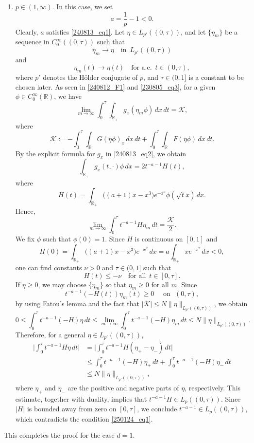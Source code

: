 \documentclass[reqno]{amsart}
\numberwithin{equation}{section}
\theoremstyle{plain}
\theoremstyle{definition}
\def\bR{\mathbb{R}}
\def\cK{\mathcal{K}}
\begin{document}
\begin{enumerate}[1.]
\item
$p\in (1, \infty)$.
In this case, we set 
\begin{equation}		\label{250124_eq1}
a=\frac{1}{p}-1<0.
\end{equation}
Clearly, $a$ satisfies \eqref{240813_eq1}.
Let  $\eta \in L_{p'}((0, \tau))$, and let $\{\eta_m\}$ be a sequence in $C^\infty_0((0,\tau))$ such that 
$$
\eta_m\to \eta \quad \text{in }\, L_{p'}((0,\tau))
$$
and 
$$
\eta_m(t)\to \eta(t) \quad \text{for a.e. }\, t\in (0,\tau),
$$
where $p'$ denotes the H\"older conjugate of $p$, and $\tau\in (0,1]$ is a constant to be chosen later.
As seen in \eqref{240812_F1} and \eqref{230805_eq3}, for a given $\phi\in C^\infty_0(\bR)$, we have 
$$
\lim_{m\to \infty} \int_0^\tau \int_{\bR_+} g_x(\eta_m \phi)\,dx\,dt=\cK,
$$
where 
$$
\cK:=-\int_0^\tau \int_{\bR} G (\eta \phi)_x\,dx\,dt+\int_0^\tau \int_{\bR} F (\eta \phi)\,dx\,dt.
$$
By the explicit formula for $g_x$ in \eqref{240813_eq2}, we obtain
$$
\int_{\bR_+} g_x(t, \cdot)\phi\,dx
=2t^{-a-1}H(t),
$$
where 
$$
H(t)=\int_{\bR_+} \big((a+1)x-x^3\big)e^{-x^2} \phi(\sqrt{t}x)\,dx.
$$
Hence, 
$$
\lim_{m\to \infty} \int_0^\tau t^{-a-1} H \eta_m \,dt=\frac{\cK}{2}.
$$
We fix $\phi$ such that $\phi(0) = 1$.
Since $H$ is continuous on $[0,1]$ and 
$$
H(0)=\int_{\bR_+} \big((a+1)x-x^3\big)e^{-x^2}\,dx = a\int_{\bR_+} x e^{-x^2}\,dx<0,
$$
one can find constants $\nu>0$ and $\tau\in (0,1]$ such that 
$$
H(t)\le -\nu \quad \text{for all }\, t\in [0, \tau].
$$
If $\eta\ge 0$, we may choose $\{\eta_m\}$ so that $\eta_m\ge0$ for all $m$.
Since
\[
t^{-a-1}(-H(t))\eta_m(t)\ge 0 \quad \textrm{ on } \,\, (0, \tau),
\]
by using Fatou's lemma and the fact that $|\cK|\le N \|\eta\|_{L_{p'}((0, \tau))}$,  we obtain 
$$
0\le \int_0^\tau t^{-a-1}(-H)\eta\,dt\le \lim_{m\to \infty} \int_0^\tau t^{-a-1}(-H)\eta_m\,dt\le N \|\eta\|_{L_{p'}((0, \tau))}.
$$
Therefore,  for a general $\eta\in L_{p'}((0, \tau))$, 
$$
\begin{aligned}
\bigg|\int_0^\tau t^{-a-1}H\eta\,dt\bigg|&=\bigg|\int_0^\tau t^{-a-1}H(\eta_+-\eta_-)\,dt\bigg|\\
&\le \int_0^\tau t^{-a-1} (-H) \eta_+\,dt+\int_0^\tau t^{-a-1}(-H)\eta_-\,dt\\
&\le N \|\eta\|_{L_{p'}((0,\tau))},
\end{aligned}
$$
where $\eta_+$ and $\eta_-$ are the positive and negative parts of $\eta$, respectively.
This estimate, together with  duality, implies that $t^{-a-1}H\in L_{p}((0, \tau))$.
Since $|H|$ is bounded away from zero on $[0,\tau]$, we conclude $t^{-a-1}\in L_{p}((0,\tau))$, which contradicts  the condition \eqref{250124_eq1}.
\end{enumerate}
This completes the proof for the case $d=1$.
\end{document}
